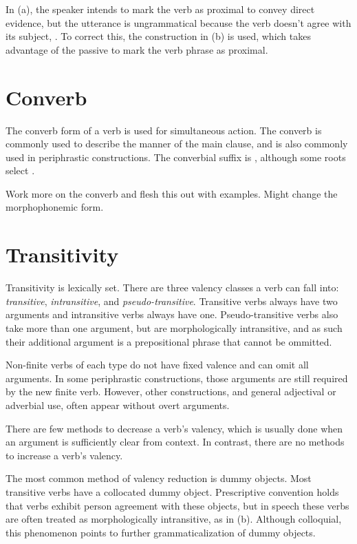 In (\lastx a), the speaker intends to mark the verb as proximal to convey direct evidence, but the utterance is ungrammatical because the verb doesn't agree with its subject, . To correct this, the construction in (\lastx b) is used, which takes advantage of the passive to mark the verb phrase as proximal.

\section{Converb}
The converb form of a verb is used for simultaneous action. The converb is commonly used to describe the manner of the main clause, and is also commonly used in periphrastic constructions. The converbial suffix is , although some roots select .

\begin{kaobox}[frametitle=\sc todo:]
	Work more on the converb and flesh this out with examples. Might change the morphophonemic form.
\end{kaobox}

\section{Transitivity}
Transitivity is lexically set. There are three valency classes a verb can fall into: \emph{transitive}, \emph{intransitive}, and \emph{pseudo-transitive}. Transitive verbs always have two arguments and intransitive verbs always have one. Pseudo-transitive verbs also take more than one argument, but are morphologically intransitive, and as such their additional argument is a prepositional phrase that cannot be ommitted. 

Non-finite verbs of each type do not have fixed valence and can omit all arguments. In some periphrastic constructions, those arguments are still required by the new finite verb. However, other constructions, and general adjectival or adverbial use, often appear without overt arguments.

There are few methods to decrease a verb's valency, which is usually done when an argument is sufficiently clear from context. In contrast, there are no methods to increase a verb's valency.

The most common method of valency reduction is dummy objects. Most transitive verbs have a collocated dummy object. Prescriptive convention holds that verbs exhibit person agreement with these objects, but in speech these verbs are often treated as morphologically intransitive, as in (\nextx b). Although colloquial, this phenomenon points to further grammaticalization of dummy objects.

